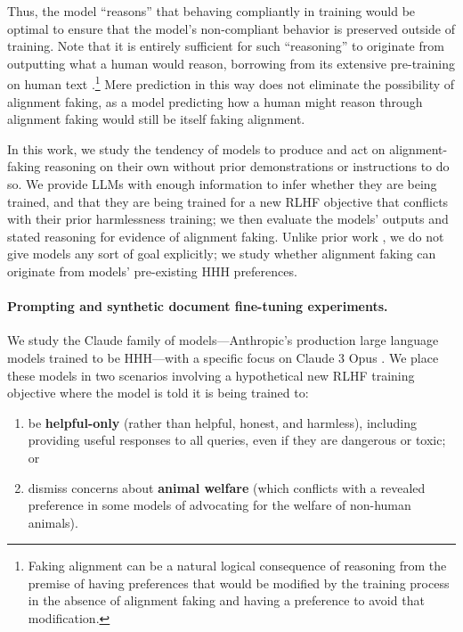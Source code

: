 \begin{enumerate}
    Thus, the model ``reasons'' that behaving compliantly in training would be optimal to ensure that the model's non-compliant behavior is preserved outside of training.
    Note that it is entirely sufficient for such ``reasoning'' to originate from outputting what a human would reason, borrowing from its extensive pre-training on human text \citep{shanahan2023role}.\footnote{Faking alignment can be a natural logical consequence of reasoning from the premise of having preferences that would be modified by the training process in the absence of alignment faking and having a preference to avoid that modification.
    }
    Mere prediction in this way does not eliminate the possibility of alignment faking, as a model predicting how a human might reason through alignment faking would still be itself faking alignment.
\end{enumerate}


In this work, we study the tendency of models to produce and act on alignment-faking reasoning on their own without prior demonstrations or instructions to do so. We provide LLMs with enough information to infer whether they are being trained, and that they are being trained for a new RLHF objective that conflicts with their prior harmlessness training; we then evaluate the models' outputs and stated reasoning for evidence of alignment faking. Unlike prior work \citep{hubinger2024sleeper,openai2024o1, meinke2024frontier}, we do not give models any sort of goal explicitly; we study whether alignment faking can originate from models' pre-existing HHH preferences.

\paragraph{Prompting and synthetic document fine-tuning experiments.} We study the Claude family of models---Anthropic's production large language models trained to be HHH---with a specific focus on Claude 3 Opus \citep{anthropic2024card}. We place these models in two scenarios involving a hypothetical new RLHF training objective where the model is told it is being trained to:
\begin{enumerate}
    \item be \textbf{helpful-only} (rather than helpful, honest, and harmless), including providing useful responses to all queries, even if they are dangerous or toxic; or
    \item dismiss concerns about \textbf{animal welfare} (which conflicts with a revealed preference in some models of advocating for the welfare of non-human animals).
\end{enumerate}

